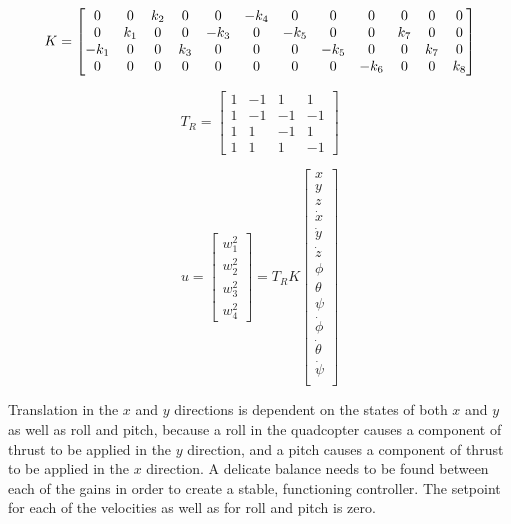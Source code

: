 \documentclass[letterpaper,12pt,titlepage,oneside,final]{book}
\begin{document}
\begin{equation} \label{eq:gain_matrix}
K =
\setcounter{MaxMatrixCols}{12}
\begin{bmatrix}
0 & 0 & k_{2} & 0 & 0 & -k_{4} & 0 & 0 & 0 & 0 & 0 & 0 \\
0 & k_{1} & 0 & 0 & -k_{3} & 0 & -k_{5} & 0 & 0 & k_{7} & 0 & 0 \\
-k_{1} & 0 & 0 & k_{3} & 0 & 0 & 0 & -k_{5} & 0 & 0 & k_{7} & 0 \\
0 & 0 & 0 & 0 & 0 & 0 & 0 & 0 & -k_{6} & 0 & 0 & k_{8}
\end{bmatrix}
\end{equation}

\begin{equation} \label{eq:rotor_transform}
T_{R} = 
\begin{bmatrix}
1 & -1 & 1 & 1 \\
1 & -1 & -1 & -1 \\
1 & 1 & -1 & 1 \\
1 & 1 & 1 & -1
\end{bmatrix}
\end{equation}

\begin{equation} \label{eq:control_equation}
u = 
\begin{bmatrix}
w_{1}^{2} \\
w_{2}^{2} \\
w_{3}^{2} \\
w_{4}^{2}
\end{bmatrix}
= T_{R}K
\begin{bmatrix}
x \\
y \\
z \\
\dot{x} \\
\dot{y} \\
\dot{z} \\
\phi \\
\theta \\
\psi \\
\dot{\phi} \\
\dot{\theta} \\
\dot{\psi} \\
\end{bmatrix}
\end{equation}

Translation in the $x$ and $y$ directions is dependent on the states of both $x$ and $y$ as well as roll and pitch, because a roll in the quadcopter causes a component of thrust to be applied in the $y$ direction, and a pitch causes a component of thrust to be applied in the $x$ direction.
A delicate balance needs to be found between each of the gains in order to create a stable, functioning controller. 
The setpoint for each of the velocities as well as for roll and pitch is zero.
\end{document}
